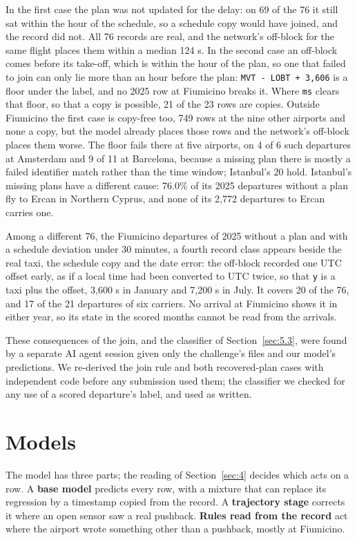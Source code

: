 \documentclass[
  manuscript=article,
  layout=preprint,
  year=2026,
  volume=x,
]{extra/joas}
\begin{document}
In the first case the plan was not updated for the delay: on 69 of the 76 it still sat within the hour of the schedule, so a schedule copy would have joined, and the record did not. All 76 records are real, and the network's off-block for the same flight places them within a median 124 s. In the second case an off-block comes before its take-off, which is within the hour of the plan, so one that failed to join can only lie more than an hour before the plan: \texttt{MVT\ -\ LOBT\ +\ 3,606} is a floor under the label, and no 2025 row at Fiumicino breaks it. Where \texttt{ms} clears that floor, so that a copy is possible, 21 of the 23 rows are copies. Outside Fiumicino the first case is copy-free too, 749 rows at the nine other airports and none a copy, but the model already places those rows and the network's off-block places them worse. The floor fails there at five airports, on 4 of 6 such departures at Amsterdam and 9 of 11 at Barcelona, because a missing plan there is mostly a failed identifier match rather than the time window; Istanbul's 20 hold. Istanbul's missing plans have a different cause: 76.0\% of its 2025 departures without a plan fly to Ercan in Northern Cyprus, and none of its 2,772 departures to Ercan carries one.

Among a different 76, the Fiumicino departures of 2025 without a plan and with a schedule deviation under 30 minutes, a fourth record class appears beside the real taxi, the schedule copy and the date error: the off-block recorded one UTC offset early, as if a local time had been converted to UTC twice, so that \texttt{y} is a taxi plus the offset, 3,600 s in January and 7,200 s in July. It covers 20 of the 76, and 17 of the 21 departures of six carriers. No arrival at Fiumicino shows it in either year, so its state in the scored months cannot be read from the arrivals.

These consequences of the join, and the classifier of Section~\ref{sec:5.3}, were found by a separate AI agent session given only the challenge's files and our model's predictions. We re-derived the join rule and both recovered-plan cases with independent code before any submission used them; the classifier we checked for any use of a scored departure's label, and used as written.

\section{Models}\label{sec:5}

The model has three parts; the reading of Section~\ref{sec:4} decides which acts on a row. A \textbf{base model} predicts every row, with a mixture that can replace its regression by a timestamp copied from the record. A \textbf{trajectory stage} corrects it where an open sensor saw a real pushback. \textbf{Rules read from the record} act where the airport wrote something other than a pushback, mostly at Fiumicino.
\end{document}
